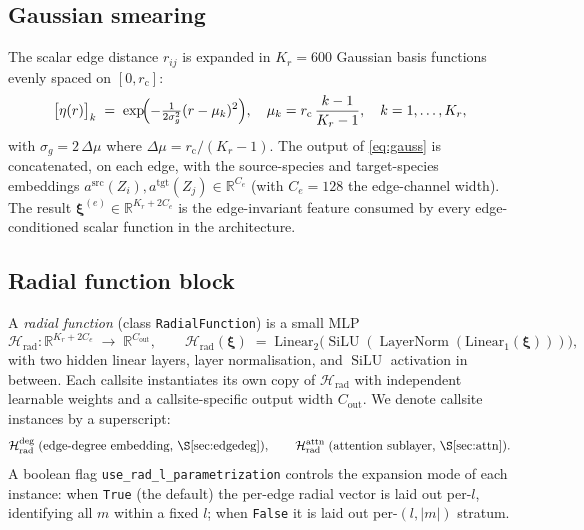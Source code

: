 \documentclass[11pt,a4paper]{article}
\DeclareMathOperator{\SiLU}{SiLU}
\DeclareMathOperator{\LN}{LayerNorm}
\newcommand{\R}{\mathbb{R}}
\newcommand{\bxi}{\bm{\xi}}
\newcommand{\rcut}{r_{\mathrm{c}}}
\newcommand{\Hb}{\mathcal{H}}
\theoremstyle{plain}
\theoremstyle{definition}
\theoremstyle{remark}
\begin{document}
\subsection{Gaussian smearing}\label{sec:gauss}

The scalar edge distance $r_{ij}$ is expanded in $K_r=600$ Gaussian basis
functions evenly spaced on $[0,\rcut]$:
\begin{equation}\label{eq:gauss}
    \bigl[\eta(r)\bigr]_k\;=\;\exp\!\Bigl(-\tfrac{1}{2\sigma_g^2}(r-\mu_k)^2\Bigr),\quad
    \mu_k=\rcut\,\frac{k-1}{K_r-1},\quad k=1,\dots,K_r,
\end{equation}
with $\sigma_g=2\,\Delta\mu$ where $\Delta\mu=\rcut/(K_r-1)$.
The output of \eqref{eq:gauss} is concatenated, on each edge, with the source-species and target-species embeddings $a^{\mathrm{src}}(Z_i),a^{\mathrm{tgt}}(Z_j)\in\R^{C_e}$ (with $C_e=128$ the edge-channel width).
The result $\bxi^{(e)}\in\R^{K_r+2C_e}$ is the edge-invariant feature consumed by every edge-conditioned scalar function in the architecture.

\subsection{Radial function block}\label{sec:radfn}

A \emph{radial function} (class \texttt{RadialFunction}) is a small MLP
\begin{equation}\label{eq:radfn}
    \Hb_{\mathrm{rad}}\colon\R^{K_r+2C_e}\;\to\;\R^{C_{\mathrm{out}}},\qquad
    \Hb_{\mathrm{rad}}(\bxi)\;=\;\mathrm{Linear}_2\!\bigl(\SiLU(\LN(\mathrm{Linear}_1(\bxi)))\bigr),
\end{equation}
with two hidden linear layers, layer normalisation, and $\SiLU$ activation in between.
Each callsite instantiates its own copy of $\Hb_{\mathrm{rad}}$ with independent learnable weights and a callsite-specific output width $C_{\mathrm{out}}$.
We denote callsite instances by a superscript:
\begin{equation}\label{eq:radfn-instances}
    \Hb_{\mathrm{rad}}^{\mathrm{deg}}\;\text{(edge-degree embedding, \S\ref{sec:edgedeg})},\qquad
    \Hb_{\mathrm{rad}}^{\mathrm{attn}}\;\text{(attention sublayer, \S\ref{sec:attn})}.
\end{equation}
A boolean flag \texttt{use\_rad\_l\_parametrization} controls the expansion mode of each instance: when \texttt{True} (the default) the per-edge radial vector is laid out per-$l$, identifying all $m$ within a fixed $l$; when \texttt{False} it is laid out per-$(l,|m|)$ stratum.
\end{document}
